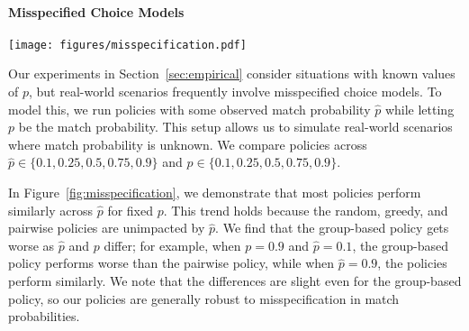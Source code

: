 \paragraph{Misspecified Choice Models}
\begin{figure*}
    \centering 
    \texttt{[image: figures/misspecification.pdf]}
    \caption{We evaluate the performance of policies when the observed match probability, $\hat{p}$, differs from the true match probability, $p$. We find that the observed match probability has little impact on the relative ordering of policies, although the group-based policy improves as $p$ and $\hat{p}$ get closer.} 
    \label{fig:misspecification}
\end{figure*}
Our experiments in Section~\ref{sec:empirical} consider situations with known values of $p$, but real-world scenarios frequently involve misspecified choice models. 
To model this, we run policies with some observed match probability $\hat{p}$ while letting $p$ be the match probability. 
This setup allows us to simulate real-world scenarios where match probability is unknown. 
We compare policies across $\hat{p} \in \{0.1,0.25,0.5,0.75,0.9\}$ and $p \in \{0.1,0.25,0.5,0.75,0.9\}$.

In Figure~\ref{fig:misspecification}, we demonstrate that most policies perform similarly across $\hat{p}$ for fixed $p$. 
This trend holds because the random, greedy, and pairwise policies are unimpacted by $\hat{p}$. 
We find that the group-based policy gets worse as $\hat{p}$ and $p$ differ; for example, when $p=0.9$ and $\hat{p}=0.1$, the group-based policy performs worse than the pairwise policy, while when $\hat{p}=0.9$, the policies perform similarly. 
We note that the differences are slight even for the group-based policy, so our policies are generally robust to misspecification in match probabilities. 

